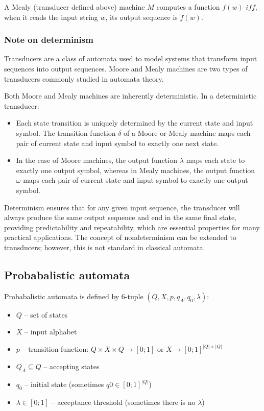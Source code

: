 \documentclass{article}
\begin{document}
A Mealy (transducer defined above) machine $M$ computes a function $f(w)$ $
iff$, when it reads the input string $w$, its output sequence is $f(w)$. 

\subsubsection{Note on determinism}

Transducers are a class of automata used to model systems that transform input
sequences into output sequences. Moore and Mealy machines are two types of
transducers commonly studied in automata theory.

Both Moore and Mealy machines are inherently deterministic. In a deterministic
transducer:

\begin{itemize}
  \item Each state transition is uniquely determined by the current state and input symbol. The transition function $\delta$ of a Moore or Mealy machine maps each pair of current state and input symbol to exactly one next state.
  \item In the case of Moore machines, the output function $\lambda$ maps each state to exactly one output symbol, whereas in Mealy machines, the output function $\omega$ maps each pair of current state and input symbol to exactly one output symbol.
\end{itemize}

Determinism ensures that for any given input sequence, the transducer will
always produce the same output sequence and end in the same final state,
providing predictability and repeatability, which are essential properties for
many practical applications.
The concept of nondeterminism can be extended to transducers; however, this is not standard in classical automata.

\subsection{Probabalistic automata}

Probabalistic automata is defined by 6-tuple $(Q,X,p,q_A, q_0, \lambda)$:

\begin{itemize}
	\item $Q$ – set of states
	\item $X$ – input alphabet
	\item $p$ – transition function: $Q \times X \times Q → [0;1]$ or $X \to {[0;1]}^{|Q|\times|Q|}$
	\item $Q_A \subseteq Q$ – accepting states
	\item $q_0$ – initial state (sometimes $q0 \in [0;1]^{|Q|}$)
	\item $\lambda \in [0;1]$ – acceptance threshold (sometimes there is no $\lambda$) 
\end{itemize}
\end{document}
